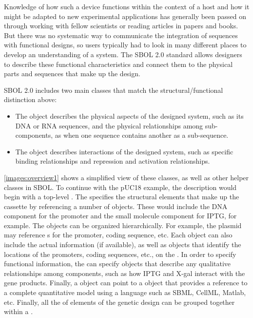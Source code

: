 Knowledge of how such a device functions within the context of a host and how it might be adapted to new experimental applications has generally been passed on through working with fellow scientists or reading articles in papers and books. 
But there was no systematic way to communicate the integration of sequences with functional designs, so users typically had to look in many different places to develop an understanding of a system.  
The SBOL 2.0 standard allows designers to describe these functional characteristics and connect them to the physical parts and sequences that make up the design. 

SBOL 2.0 includes two main classes that match the structural/functional distinction above:
\begin{itemize}
\item The  object describes the physical aspects of the designed system, such as its DNA or RNA sequences, and the physical relationships among sub-components, as when one sequence contains another as a sub-sequence.
\item The  object describes interactions of the designed system, such as specific binding relationships and repression and activation relationships. 
\end{itemize}

\ref{images:overview1} shows a simplified view of these classes, as well as other helper classes in SBOL. To continue with the pUC18 example, the description would begin with a top-level .  
The  specifies the structural elements that make up the cassette by referencing a number of  objects. These would include the DNA component for the promoter and the small molecule component for IPTG, for example.  
The  objects can be organized hierarchically.  For example, the plasmid  may reference s for the promoter, coding sequence, etc.  
Each  object can also include the actual  information (if available), as well as  objects that identify the locations of the promoters, coding sequences, etc., on the .  
In order to specify functional information, the  can specify  objects that describe any qualitative relationships among components, such as how IPTG and X-gal interact with the gene products.  Finally, a  object can point to a  object that provides a reference to a complete quantitative model using a language such as SBML, CellML, Matlab, etc.  Finally, all the of elements of the genetic design can be grouped together within a .

